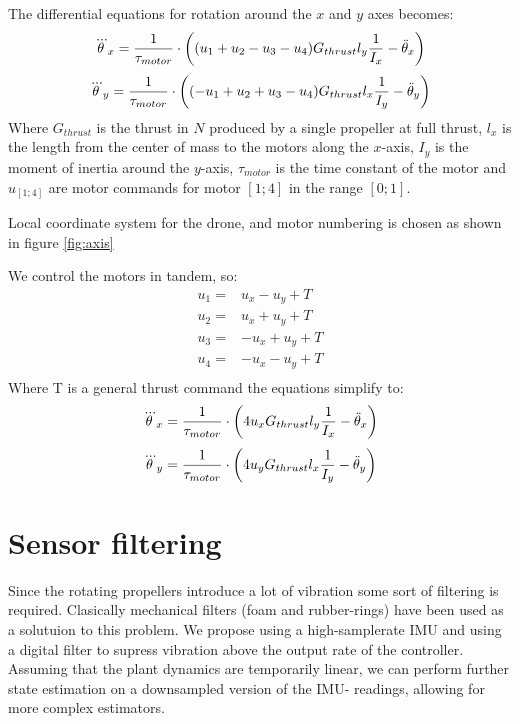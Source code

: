 The differential equations for rotation around the $x$ and $y$ axes
becomes:
\begin{equation}
 \dddot\theta_x = \frac{1}{\tau_{motor}} \cdot \left(
 (u_1 + u_2 - u_3 - u_4) G_{thrust} l_{y} \frac{ 1 }{ I_{x} }  - \ddot\theta_x
 \right) 
\end{equation}
\begin{equation}
 \dddot\theta_y = \frac{1}{\tau_{motor}} \cdot \left(
 (-u_1 + u_2 + u_3 - u_4) G_{thrust} l_{x} \frac{ 1 }{ I_{y} }  - \ddot\theta_y
 \right) 
\end{equation}
Where $G_{thrust}$ is the thrust in $N$ produced by a single propeller at full
thrust, $l_{x}$ is the length from the center of mass to the motors along the
$x$-axis, $I_{y}$ is the moment of inertia around the $y$-axis,
$\tau_{motor}$ is the time constant of the motor and $u_{[1;4]}$ are motor
commands for motor $[1;4]$ in the range $[0;1]$.

Local coordinate system for the drone, and motor numbering is chosen as shown in
figure \ref{fig:axis}

We control the motors in tandem, so:
\begin{align}
u_1 = & u_x - u_y + T\\
u_2 = & u_x + u_y + T\\
u_3 = & -u_x + u_y + T\\
u_4 = & -u_x - u_y + T\\
\end{align}
Where T is a general thrust command the equations simplify to:
\begin{equation}
 \dddot\theta_x = \frac{1}{\tau_{motor}} \cdot \left(
 4 u_x G_{thrust} l_{y} \frac{ 1 }{ I_{x} }  - \ddot\theta_x
 \right) 
\end{equation}
\begin{equation}
 \dddot\theta_y = \frac{1}{\tau_{motor}} \cdot \left(
4 u_y G_{thrust} l_{x} \frac{ 1 }{ I_{y} }  - \ddot\theta_y
 \right) 
\end{equation}


\section{ Sensor filtering } %
Since the rotating propellers introduce a lot of vibration some sort of
filtering is required. Clasically mechanical filters (foam and rubber-rings) have
been used as a solutuion to this problem. We propose using a high-samplerate
IMU and using a digital filter to supress vibration above the output rate of the
controller. Assuming that the plant dynamics are temporarily linear, we can
perform further state estimation on a downsampled version of the IMU- readings,
allowing for more complex estimators.


